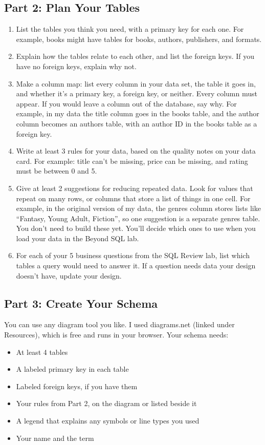 \documentclass[12pt]{article}
\begin{document}
\subsection*{Part 2: Plan Your Tables}
\begin{enumerate}
    \item List the tables you think you need, with a primary key for each one. For example, books might have tables for books, authors, publishers, and formats.
    \item Explain how the tables relate to each other, and list the foreign keys. If you have no foreign keys, explain why not.
    \item Make a column map: list every column in your data set, the table it goes in, and whether it's a primary key, a foreign key, or neither. Every column must appear. If you would leave a column out of the database, say why. For example, in my data the title column goes in the books table, and the author column becomes an authors table, with an author ID in the books table as a foreign key.
    \item Write at least 3 rules for your data, based on the quality notes on your data card. For example: title can't be missing, price can be missing, and rating must be between 0 and 5.
    \item Give at least 2 suggestions for reducing repeated data. Look for values that repeat on many rows, or columns that store a list of things in one cell. For example, in the original version of my data, the genres column stores lists like ``Fantasy, Young Adult, Fiction'', so one suggestion is a separate genres table. You don't need to build these yet. You'll decide which ones to use when you load your data in the Beyond SQL lab.
    \item For each of your 5 business questions from the SQL Review lab, list which tables a query would need to answer it. If a question needs data your design doesn't have, update your design.
\end{enumerate}

\subsection*{Part 3: Create Your Schema}
You can use any diagram tool you like. I used diagrams.net (linked under Resources), which is free and runs in your browser. Your schema needs:
\begin{itemize}
    \item At least 4 tables
    \item A labeled primary key in each table
    \item Labeled foreign keys, if you have them
    \item Your rules from Part 2, on the diagram or listed beside it
    \item A legend that explains any symbols or line types you used
    \item Your name and the term
\end{itemize}
\end{document}
